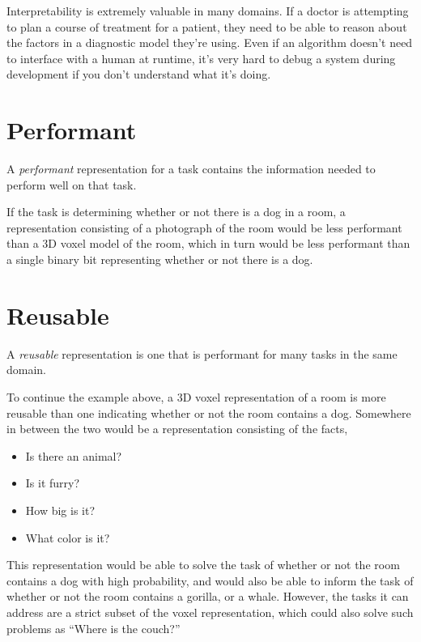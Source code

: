 \documentclass[12pt,twoside]{mitthesis}
\providecommand{\tightlist}{%
  \setlength{\itemsep}{0pt}\setlength{\parskip}{0pt}}
\begin{document}
Interpretability is extremely valuable in many domains. If a doctor is
attempting to plan a course of treatment for a patient, they need to be
able to reason about the factors in a diagnostic model they're using.
Even if an algorithm doesn't need to interface with a human at runtime,
it's very hard to debug a system during development if you don't
understand what it's doing.

\section{Performant}\label{performant}

A \emph{performant} representation for a task contains the information
needed to perform well on that task.

If the task is determining whether or not there is a dog in a room, a
representation consisting of a photograph of the room would be less
performant than a 3D voxel model of the room, which in turn would be
less performant than a single binary bit representing whether or not
there is a dog.

\section{Reusable}\label{reusable}

A \emph{reusable} representation is one that is performant for many
tasks in the same domain.

To continue the example above, a 3D voxel representation of a room is
more reusable than one indicating whether or not the room contains a
dog. Somewhere in between the two would be a representation consisting
of the facts,

\begin{itemize}
\tightlist
\item
  Is there an animal?
\item
  Is it furry?
\item
  How big is it?
\item
  What color is it?
\end{itemize}

This representation would be able to solve the task of whether or not
the room contains a dog with high probability, and would also be able to
inform the task of whether or not the room contains a gorilla, or a
whale. However, the tasks it can address are a strict subset of the
voxel representation, which could also solve such problems as ``Where is
the couch?''
\end{document}
